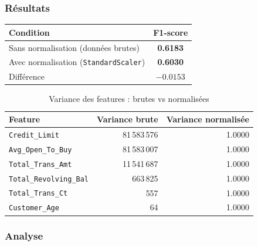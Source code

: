 \documentclass[12pt,a4paper]{article}
\newcommand{\feature}[1]{\texttt{\small #1}}
\newcommand{\score}[1]{\textbf{#1}}
\begin{document}
\subsubsection{Résultats}

\begin{resultbox}[Comparaison KNN (K=5) : données brutes vs normalisées]
\begin{tabular}{lc}
\toprule
\textbf{Condition} & \textbf{F1-score} \\
\midrule
Sans normalisation (données brutes) & \score{0.6183} \\
Avec normalisation (\texttt{StandardScaler}) & \score{0.6030} \\
\midrule
Différence & \score{$-0.0153$} \\
\bottomrule
\end{tabular}
\end{resultbox}

\begin{table}[H]
\centering
\caption{Variance des features : brutes vs normalisées}
\begin{tabular}{lrr}
\toprule
\textbf{Feature} & \textbf{Variance brute} & \textbf{Variance normalisée} \\
\midrule
\feature{Credit\_Limit}          & 81\,583\,576 & 1.0000 \\
\feature{Avg\_Open\_To\_Buy}     & 81\,583\,007 & 1.0000 \\
\feature{Total\_Trans\_Amt}      & 11\,541\,687 & 1.0000 \\
\feature{Total\_Revolving\_Bal}  &    663\,825  & 1.0000 \\
\feature{Total\_Trans\_Ct}       &        557   & 1.0000 \\
\feature{Customer\_Age}          &         64   & 1.0000 \\
\bottomrule
\end{tabular}
\end{table}

\subsubsection{Analyse}
\end{document}
